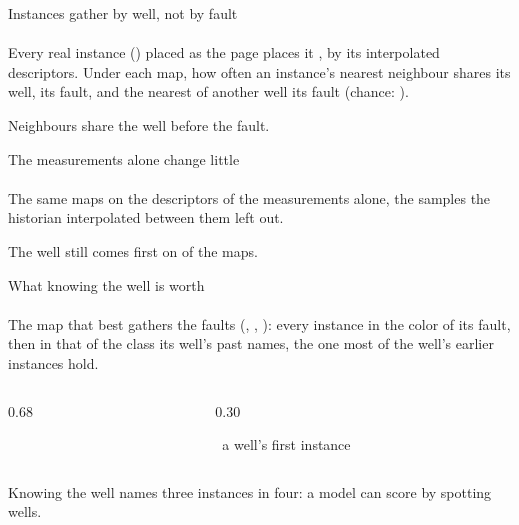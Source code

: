 \begin{frame}{Instances gather by well, not by fault}
  \framesubtitle{\isquestion}
  {\scriptsize\color{ws3wbrown} Every real instance (\isInstances) placed as the page places it
  \hyperlink{instances}{}, by its interpolated descriptors. Under each
  map, how often an instance's nearest neighbour shares its well, its fault, and the nearest of
  another well its fault (chance: \isChance).\par}
  \vskip 1mm
  {\centering\tiny\setlength{\tabcolsep}{4pt}\par}
  \vskip 1mm
  \centering
  \def\ismode{i}
  \par
  \vfill
  \alert{Neighbours share the well before the fault.}
\end{frame}

\begin{frame}{The measurements alone change little}
  \framesubtitle{\isquestion}
  {\scriptsize\color{ws3wbrown} The same maps on the descriptors of the measurements alone, the
  samples the historian interpolated between them left out.\par}
  \vskip 2mm
  \centering
  \def\ismode{m}
  
  \par
  \vfill
  \alert{The well still comes first on \isWellWinsMeas{} of the \isMapsMeas{} maps.}
\end{frame}

\begin{frame}{What knowing the well is worth}
  \framesubtitle{\isquestion}
  {\scriptsize\color{ws3wbrown} The map that best gathers the faults (\isBestRep, \isBestData,
  \isBestEmb): every instance in the color of its fault, then in that of the class its well's past
  names, the one most of the well's earlier instances hold.\par}
  \vskip 2mm
  \begin{columns}[T]
    \begin{column}{0.68\textwidth}
      \centering
      
    \end{column}
    \begin{column}{0.30\textwidth}
      \centering\tiny\setlength{\tabcolsep}{2pt}
      \def\arraystretch{1.3}
      
      \vskip 1mm
      ~a well's first instance
    \end{column}
  \end{columns}
  \vfill
  \centering
  \alert{Knowing the well names three instances in four: a model can score by spotting wells.}
\end{frame}
